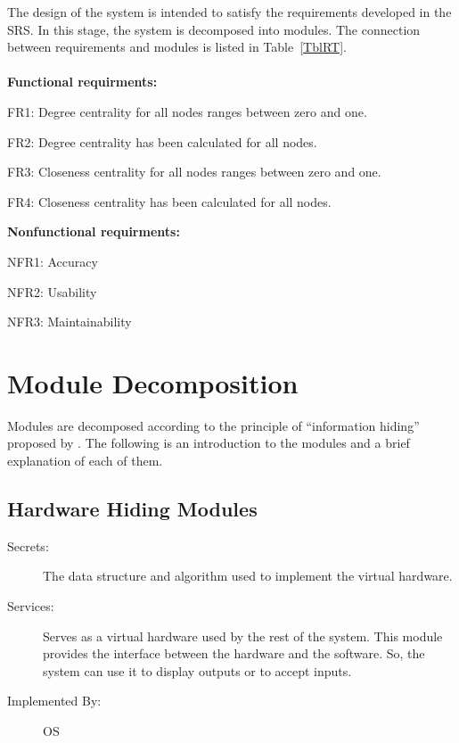 \documentclass[12pt, titlepage]{article}
\begin{document}
The design of the system is intended to satisfy the requirements developed in
the SRS. In this stage, the system is decomposed into modules. The connection
between requirements and modules is listed in Table~\ref{TblRT}.\\\\
\textbf{Functional requirments:}
\begin{description}
\item FR1: Degree centrality for all nodes ranges between zero and one.
\item FR2: Degree centrality has been calculated for all nodes.
\item FR3: Closeness centrality for all nodes ranges between zero and one.
\item FR4: Closeness centrality has been calculated for all nodes.\\
\end{description}

\textbf{Nonfunctional requirments:}
\begin{description}
\item NFR1: Accuracy
\item NFR2: Usability
\item NFR3: Maintainability
\end{description}


\section{Module Decomposition} \label{SecMD}

Modules are decomposed according to the principle of ``information hiding''
proposed by \citet{ParnasEtAl1984}. 
The following is an introduction to the modules and a brief explanation of each of them.


\subsection{Hardware Hiding Modules }
\begin{description}
\item[Secrets:]The data structure and algorithm used to implement the virtual
  hardware.
\item[Services:]Serves as a virtual hardware used by the rest of the
 system. This module provides the interface between the hardware and the
 software. So, the system can use it to display outputs or to accept inputs.
\item[Implemented By:] OS
\end{description}
\end{document}
